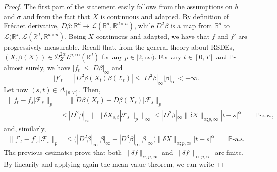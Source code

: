\documentclass[11pt,a4paper]{article}
\newcommand{\R}{\mathbb{R}}
\newcommand{\E}{\mathbb{E}}
\theoremstyle{plain}
\begin{document}
\begin{proof} 
    The first part of the statement easily follows from the assumptions on $b$ and $\sigma$ and from the fact that $X$ is continuous and adapted.
    By definition of Fréchet derivative, \linebreak $D\beta: \R^d \to \mathscr{L}(\R^d,\R^{d \times n})$, while $D^2\beta$ is a map from $\R^d$ to $\mathscr{L}(\R^d,\mathscr{L}(\R^d,\R^{d \times n})$. 
    Being $X$ continuous and adapted, we have that $f$ and $f'$ are progressively measurable. Recall that, from the general theory about RSDEs, $(X,\beta(X)) \in \mathscr{D}_Z^{2\alpha}L^{p,\infty}(\R^d)$ for any $p \in [2,\infty)$. For any $t \in [0,T]$ and $\mathbb{P}$-almost surely, we have $|f_t|\le|D\beta|_\infty$ and \begin{equation*} \label{eq:infinitynormoff'}|f'_t|=|D^2\beta(X_t)\beta(X_t)| \le |D^2\beta|_\infty |\beta|_\infty < +\infty.
    \end{equation*} 
    Let now $(s,t) \in \Delta_{[0,T]}$. Then,  \begin{equation*}
        \begin{aligned}
            \|f_t-f_s|\mathcal{F}_s\|_p &= \|D\beta(X_t)-D\beta(X_s)|\mathcal{F}_s\|_p %
            \\
            &\le |D^2\beta|_\infty \|\|\delta X_{s,t}|\mathcal{F}_s\|_p\|_\infty \le |D^2\beta|_\infty \|\delta X\|_{\alpha;p,\infty}|t-s|^\alpha \qquad \text{$\mathbb{P}$-a.s.},
        \end{aligned}
    \end{equation*} and, similarly, \begin{equation*}
        \begin{aligned}
            \|f'_t-f'_s|\mathcal{F}_s\|_p 
            &\le \big(|D^2\beta|_\infty|\beta|_\infty  + |D^3\beta|_\infty|\beta|_\infty\big) \|\delta X\|_{\alpha;p,\infty} |t-s|^\alpha \qquad \text{$\mathbb{P}$-a.s.}
        \end{aligned}
    \end{equation*}  
    The previous estimates prove that both $\|\delta f\|_{\alpha;p,\infty}$ and $\|\delta f'\|_{\alpha;p,\infty}$ are finite. By linearity and applying again the mean value theorem, we can write
    

\end{proof}
\end{document}
